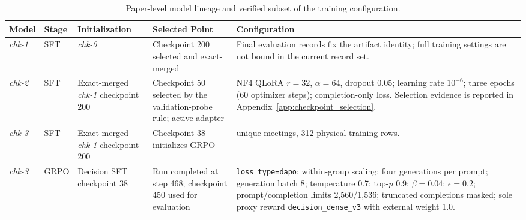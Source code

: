 \begin{table}[H]
    \centering
    \footnotesize
    \setlength{\tabcolsep}{3pt}
    \renewcommand{\arraystretch}{1.16}
    \begin{tabularx}{\textwidth}{@{}
        >{\centering\arraybackslash}p{}
        >{\centering\arraybackslash}p{}
        >{\raggedright\arraybackslash}p{}
        >{\raggedright\arraybackslash}p{}
        >{\raggedright\arraybackslash}X
    @{}}
        \toprule
        \textbf{Model} & \textbf{Stage} & \textbf{Initialization} &
        \textbf{Selected Point} &
        \textbf{Configuration} \\
        \midrule
        \textit{chk-1} & SFT & \textit{chk-0} & Checkpoint 200 selected and
        exact-merged & Final evaluation records fix the artifact identity;
        full training settings are not bound in the current record set. \\
        \textit{chk-2} & SFT & Exact-merged \textit{chk-1} checkpoint 200 &
        Checkpoint 50 selected by the validation-probe rule; active adapter &
        NF4 QLoRA $r=32$, $\alpha=64$, dropout 0.05; learning rate
        $10^{-6}$; three epochs (60 optimizer steps); completion-only loss.
        Selection evidence is reported in Appendix~\ref{app:checkpoint_selection}. \\
        \textit{chk-3} & SFT & Exact-merged \textit{chk-1} checkpoint 200 &
        Checkpoint 38 initializes GRPO & 211 unique meetings, 312 physical
        training rows. \\
        \textit{chk-3} & GRPO & Decision SFT checkpoint 38 & Run completed at
        step 468; checkpoint 450 used for evaluation &
        \texttt{loss\_type=dapo}; within-group scaling; four generations per
        prompt; generation batch 8; temperature 0.7; top-$p$ 0.9;
        $\beta=0.04$; $\epsilon=0.2$; prompt/completion limits 2,560/1,536;
        truncated completions masked; sole proxy reward
        \texttt{decision\_dense\_v3} with external weight 1.0. \\
        \bottomrule
    \end{tabularx}
    \caption{Paper-level model lineage and verified subset of the training configuration.}
    \label{tab:ch2:training_hyperparameters_archive}
\end{table}
